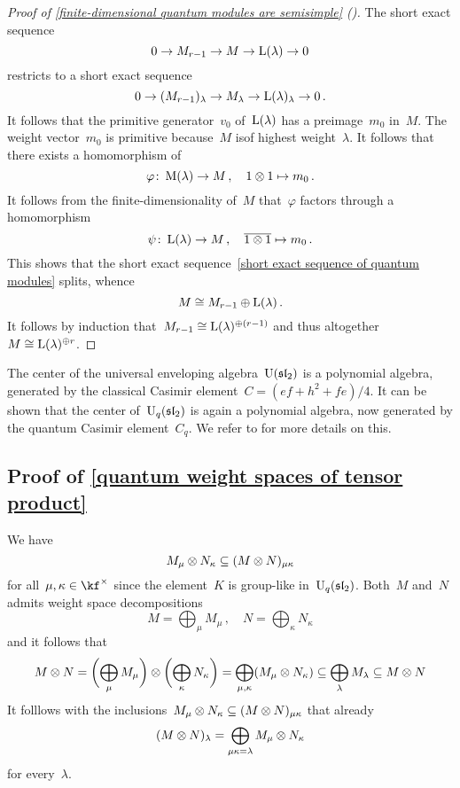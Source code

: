 \documentclass[a4paper, 11pt, oneside]{scrartcl}
\begin{document}
\begin{proof}[Proof of \cref{finite-dimensional quantum modules are semisimple} ({\cite[Theorem~2.9]{jantzen_quantum}})]
  The short exact sequence
  \begin{equation}
    \label{short exact sequence of quantum modules}
    0
    \to
    M_{r-1}
    \to
    M
    \to
    \operatorname{L}(\lambda)
    \to
    0
  \end{equation}
  restricts to a short exact sequence
  \[
    0
    \to
    ( M_{r-1} )_\lambda
    \to
    M_\lambda
    \to
    \operatorname{L}(\lambda)_\lambda
    \to
    0 \,.
  \]
  It follows that the primitive generator~$v_0$ of~$\operatorname{L}(\lambda)$ has a preimage~$m_0$ in~$M$.
  The weight vector~$m_0$ is primitive because~$M$ isof highest weight~$\lambda$.
  It follows that there exists a homomorphism of~
  \[
    \varphi
    \colon
    \operatorname{M}(\lambda)
    \to
    M
    \,,
    \quad
    1 \otimes 1
    \mapsto
    m_0 \,.
  \]
  It follows from the finite-dimensionality of~$M$ that~$\varphi$ factors through a homomorphism
  \[
    \psi
    \colon
    \operatorname{L}(\lambda)
    \to
    M
    \,,
    \quad
    \overline{1 \otimes 1}
    \mapsto
    m_0 \,.
  \]
  This shows that the short exact sequence~\eqref{short exact sequence of quantum modules} splits, whence
  \[
    M \cong M_{r-1} \oplus \operatorname{L}(\lambda) \,.
  \]
  It follows by induction that~$M_{r-1} \cong \operatorname{L}(\lambda)^{\oplus (r-1)}$ and thus altogether~$M \cong \operatorname{L}(\lambda)^{\oplus r}$.
\end{proof}

\begin{remark}
  The center of the universal enveloping algebra~$\operatorname{U}(\mathfrak{sl}_2)$ is a polynomial algebra, generated by the classical Casimir element~$C = (ef + h^2 + fe)/4$.
  It can be shown that the center of~$\operatorname{U}_q(\mathfrak{sl}_2)$ is again a polynomial algebra, now generated by the quantum Casimir element~$C_q$.
  We refer to \cite[Proposition~2.18]{jantzen_quantum} for more details on this.
\end{remark}



\subsection{Proof of \cref{quantum weight spaces of tensor product}}
\label{proof of quantum weight spaces of tensor product}

We have
\[
  M_\mu \otimes N_\kappa
  \subseteq
  (M \otimes N)_{\mu \kappa}
\]
for all~$\mu, \kappa \in \kf^\times$ since the element~$K$ is group-like in~$\operatorname{U}_q(\mathfrak{sl}_2)$.
Both~$M$ and~$N$ admits weight space decompositions
\[
  M = \bigoplus_\mu M_\mu \,,
  \quad
  N = \bigoplus_\kappa N_\kappa
\]
and it follows that
\[
  M \otimes N
  =
  \biggl( \bigoplus_\mu M_\mu  \biggr)
  \otimes
  \biggl( \bigoplus_\kappa N_\kappa  \biggr)
  =
  \bigoplus_{\mu, \kappa} (M_\mu \otimes N_\kappa)
  \subseteq
  \bigoplus_{\lambda} M_{\lambda}
  \subseteq
  M \otimes N
\]
It folllows with the inclusions~$M_\mu \otimes N_\kappa \subseteq (M \otimes N)_{\mu \kappa}$ that already
\[
  (M \otimes N)_{\lambda}
  =
  \bigoplus_{\mu \kappa = \lambda}
  M_\mu \otimes N_\kappa
\]
for every~$\lambda$.
\end{document}
